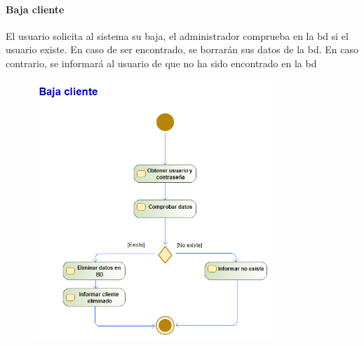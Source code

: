 \paragraph{Baja cliente}
El usuario solicita al sistema su baja, el administrador comprueba en la \gls{bd} si el usuario existe. En caso de ser encontrado, se borrarán sus datos de la \gls{bd}. En caso contrario, se informará al usuario de que no ha sido encontrado en la \gls{bd}
\begin{figure}[H]
    \centering
    \includegraphics[width=0.8\textwidth]{Use_Cases/baja_cliente.png}
\end{figure}

